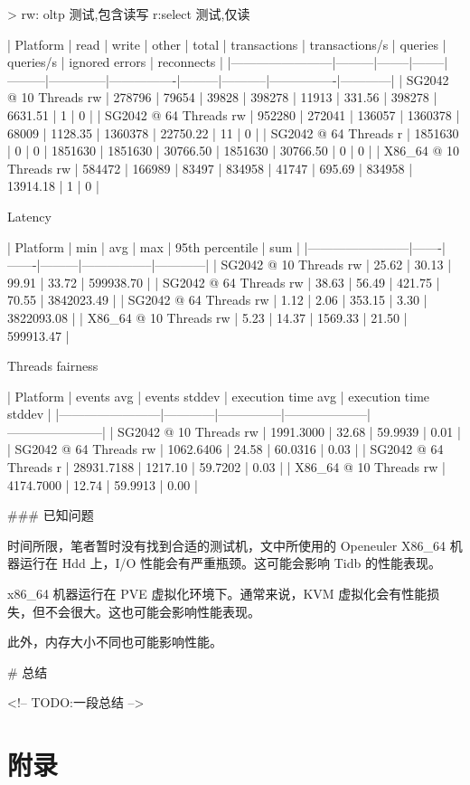 \documentclass{article}
\begin{document}
\begin{markdown}
> rw: oltp 测试,包含读写 r:select 测试,仅读

| Platform               | read    | write  | other  | total   | transactions | transactions/s | queries | queries/s | ignored errors | reconnects |
|------------------------|---------|--------|--------|---------|--------------|----------------|---------|-----------|----------------|------------|
| SG2042 @ 10 Threads rw | 278796  | 79654  | 39828  | 398278  | 11913        | 331.56         | 398278  | 6631.51   | 1              | 0          |
| SG2042 @ 64 Threads rw | 952280  | 272041 | 136057 | 1360378 | 68009        | 1128.35        | 1360378 | 22750.22  | 11             | 0          |
| SG2042 @ 64 Threads r  | 1851630 | 0      | 0      | 1851630 | 1851630      | 30766.50       | 1851630 | 30766.50  | 0              | 0          |
| X86_64 @ 10 Threads rw | 584472  | 166989 | 83497  | 834958  | 41747        | 695.69         | 834958  | 13914.18  | 1              | 0          |

Latency

| Platform               | min   | avg   | max     | 95th percentile | sum        |
|------------------------|-------|-------|---------|-----------------|------------|
| SG2042 @ 10 Threads rw | 25.62 | 30.13 | 99.91   | 33.72           | 599938.70  |
| SG2042 @ 64 Threads rw | 38.63 | 56.49 | 421.75  | 70.55           | 3842023.49 |
| SG2042 @ 64 Threads rw | 1.12  | 2.06  | 353.15  | 3.30            | 3822093.08 |
| X86_64 @ 10 Threads rw | 5.23  | 14.37 | 1569.33 | 21.50           | 599913.47  |


Threads fairness

| Platform               | events avg | events stddev | execution time avg | execution time stddev |
|------------------------|------------|---------------|--------------------|-----------------------|
| SG2042 @ 10 Threads rw | 1991.3000  | 32.68         | 59.9939            | 0.01                  |
| SG2042 @ 64 Threads rw | 1062.6406  | 24.58         | 60.0316            | 0.03                  |
| SG2042 @ 64 Threads r  | 28931.7188 | 1217.10       | 59.7202            | 0.03                  |
| X86_64 @ 10 Threads rw | 4174.7000  | 12.74         | 59.9913            | 0.00                  |

### 已知问题

时间所限，笔者暂时没有找到合适的测试机，文中所使用的 Openeuler X86_64 机器运行在 Hdd 上，I/O 性能会有严重瓶颈。这可能会影响 Tidb 的性能表现。

x86_64 机器运行在 PVE 虚拟化环境下。通常来说，KVM 虚拟化会有性能损失，但不会很大。这也可能会影响性能表现。

此外，内存大小不同也可能影响性能。

# 总结

<!-- TODO:一段总结 -->

\end{markdown}

\newpage
\appendix

\section{附录}

\end{document}
